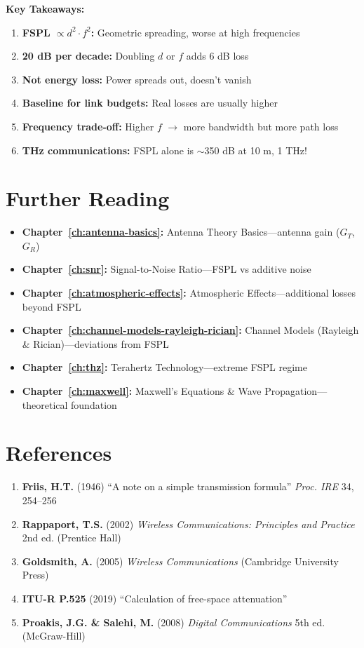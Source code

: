 \begin{keyconcept}
\textbf{Key Takeaways:}
\begin{enumerate}
\item \textbf{FSPL $\propto d^2 \cdot f^2$:} Geometric spreading, worse at high frequencies
\item \textbf{20 dB per decade:} Doubling $d$ or $f$ adds 6 dB loss
\item \textbf{Not energy loss:} Power spreads out, doesn't vanish
\item \textbf{Baseline for link budgets:} Real losses are usually higher
\item \textbf{Frequency trade-off:} Higher $f$ $\rightarrow$ more bandwidth but more path loss
\item \textbf{THz communications:} FSPL alone is $\sim$350 dB at 10 m, 1 THz!
\end{enumerate}
\end{keyconcept}

\section{Further Reading}
\label{sec:further-reading}

\begin{itemize}
\item \textbf{Chapter~\ref{ch:antenna-basics}:} Antenna Theory Basics---antenna gain ($G_T$, $G_R$)
\item \textbf{Chapter~\ref{ch:snr}:} Signal-to-Noise Ratio---FSPL vs additive noise
\item \textbf{Chapter~\ref{ch:atmospheric-effects}:} Atmospheric Effects---additional losses beyond FSPL
\item \textbf{Chapter~\ref{ch:channel-models-rayleigh-rician}:} Channel Models (Rayleigh \& Rician)---deviations from FSPL
\item \textbf{Chapter~\ref{ch:thz}:} Terahertz Technology---extreme FSPL regime
\item \textbf{Chapter~\ref{ch:maxwell}:} Maxwell's Equations \& Wave Propagation---theoretical foundation
\end{itemize}

\section{References}
\label{sec:references}

\begin{enumerate}
\item \textbf{Friis, H.T.} (1946) ``A note on a simple transmission formula'' \textit{Proc. IRE} 34, 254--256
\item \textbf{Rappaport, T.S.} (2002) \textit{Wireless Communications: Principles and Practice} 2nd ed. (Prentice Hall)
\item \textbf{Goldsmith, A.} (2005) \textit{Wireless Communications} (Cambridge University Press)
\item \textbf{ITU-R P.525} (2019) ``Calculation of free-space attenuation''
\item \textbf{Proakis, J.G. \& Salehi, M.} (2008) \textit{Digital Communications} 5th ed. (McGraw-Hill)
\end{enumerate}
